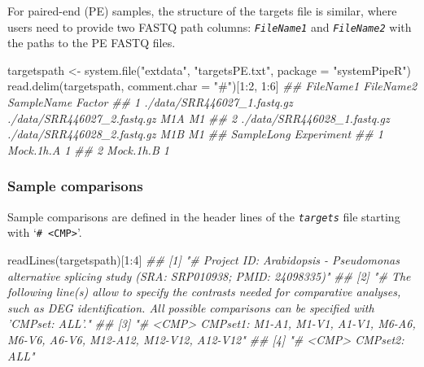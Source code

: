 \documentclass[14pt,]{article}
\newcommand{\hlnum}[1]{\textcolor[rgb]{0.816,0.125,0.439}{#1}}%
\newcommand{\hlstr}[1]{\textcolor[rgb]{0.251,0.627,0.251}{#1}}%
\newcommand{\hlcom}[1]{\textcolor[rgb]{0.502,0.502,0.502}{\textit{#1}}}%
\newcommand{\hlopt}[1]{\textcolor[rgb]{0,0,0}{#1}}%
\newcommand{\hlstd}[1]{\textcolor[rgb]{0.251,0.251,0.251}{#1}}%
\newcommand{\hlkwc}[1]{\textcolor[rgb]{0.251,0.251,0.251}{#1}}%
\newcommand{\hlkwd}[1]{\textcolor[rgb]{0.878,0.439,0.125}{#1}}%
\newenvironment{Shaded}{\begin{myshaded}}{\end{myshaded}}
\newcommand{\KeywordTok}[1]{\hlkwd{#1}}
\newcommand{\DataTypeTok}[1]{\hlkwc{#1}}
\newcommand{\DecValTok}[1]{\hlnum{#1}}
\newcommand{\StringTok}[1]{\hlstr{#1}}
\newcommand{\CommentTok}[1]{\hlcom{#1}}
\newcommand{\OperatorTok}[1]{\hlopt{#1}}
\newcommand{\NormalTok}[1]{\hlstd{#1}}
\begin{document}
For paired-end (PE) samples, the structure of the targets file is similar, where
users need to provide two FASTQ path columns: \emph{\texttt{FileName1}} and \emph{\texttt{FileName2}}
with the paths to the PE FASTQ files.

\begin{Shaded}
\begin{Highlighting}[]
\NormalTok{targetspath <-}\StringTok{ }\KeywordTok{system.file}\NormalTok{(}\StringTok{"extdata"}\NormalTok{, }\StringTok{"targetsPE.txt"}\NormalTok{, }\DataTypeTok{package =} \StringTok{"systemPipeR"}\NormalTok{)}
\KeywordTok{read.delim}\NormalTok{(targetspath, }\DataTypeTok{comment.char =} \StringTok{"#"}\NormalTok{)[}\DecValTok{1}\OperatorTok{:}\DecValTok{2}\NormalTok{, }\DecValTok{1}\OperatorTok{:}\DecValTok{6}\NormalTok{]}
\CommentTok{##                     FileName1                   FileName2 SampleName Factor}
\CommentTok{## 1 ./data/SRR446027_1.fastq.gz ./data/SRR446027_2.fastq.gz        M1A     M1}
\CommentTok{## 2 ./data/SRR446028_1.fastq.gz ./data/SRR446028_2.fastq.gz        M1B     M1}
\CommentTok{##   SampleLong Experiment}
\CommentTok{## 1  Mock.1h.A          1}
\CommentTok{## 2  Mock.1h.B          1}
\end{Highlighting}
\end{Shaded}

\hypertarget{sample-comparisons}{%
\subsubsection{Sample comparisons}\label{sample-comparisons}}

Sample comparisons are defined in the header lines of the \emph{\texttt{targets}} file
starting with `\texttt{\# \textless{}CMP\textgreater{}}'.

\begin{Shaded}
\begin{Highlighting}[]
\KeywordTok{readLines}\NormalTok{(targetspath)[}\DecValTok{1}\OperatorTok{:}\DecValTok{4}\NormalTok{]}
\CommentTok{## [1] "# Project ID: Arabidopsis - Pseudomonas alternative splicing study (SRA: SRP010938; PMID: 24098335)"                                                                              }
\CommentTok{## [2] "# The following line(s) allow to specify the contrasts needed for comparative analyses, such as DEG identification. All possible comparisons can be specified with 'CMPset: ALL'."}
\CommentTok{## [3] "# <CMP> CMPset1: M1-A1, M1-V1, A1-V1, M6-A6, M6-V6, A6-V6, M12-A12, M12-V12, A12-V12"                                                                                             }
\CommentTok{## [4] "# <CMP> CMPset2: ALL"}
\end{Highlighting}
\end{Shaded}
\end{document}
